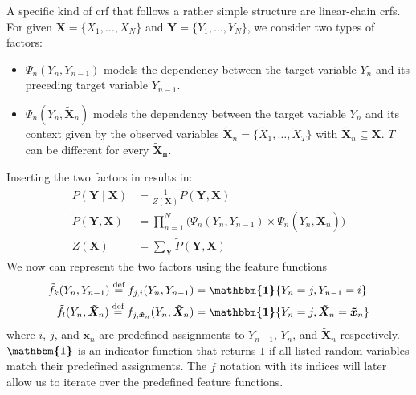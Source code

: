 \bigskip

A specific kind of \gls{crf} that follows a rather simple structure are \glspl{linear-chain crf}.
For given $\bm{X}=\{X_1,\dots,X_N\}$ and $\bm{Y}=\{Y_1,\dots,Y_N\}$, we consider two types of \glspl{factor}:
\begin{itemize}
  \item $\Psi_n(Y_n,Y_{n-1})$ models the dependency between the \gls{target variable} $Y_n$ and its preceding \gls{target variable} $Y_{n-1}$.
  \item $\Psi_n(Y_n,\bm{\tilde{X}}_n)$ models the dependency between the \gls{target variable} $Y_n$ and its context given by the \glspl{observed variable} $\bm{\tilde{X}}_n=\{\tilde{X}_1,\dots,\tilde{X}_T\}$ with $\bm{\tilde{X}}_n\subseteq\bm{X}$.
    $T$ can be different for every $\bm{\tilde{X}_n}$.
\end{itemize}
Inserting the two factors in  results in:
\begin{equation}
  \label{equ:linear-chain-crf-factor}
  \begin{split}
    P(\bm{Y}\mid\bm{X}) & = \frac{1}{Z(\bm{X})}\tilde{P}(\bm{Y},\bm{X}) \\
    \tilde{P}(\bm{Y},\bm{X}) &= \prod_{n=1}^{N}\Big(\Psi_n(Y_n,Y_{n-1})\times\Psi_n(Y_n,\bm{\tilde{X}}_n)\Big) \\
    Z(\bm{X}) & = \sum_{\bm{Y}}\tilde{P}(\bm{Y},\bm{X})
  \end{split}
\end{equation}
We now can represent the two \glspl{factor} using the \glspl{feature function}
\begin{equation}
  \label{equ:linear-chain-crf-feature-functions}
  \begin{split}
    \tilde{f}_k(Y_n,Y_{n-1})\equalsdef f_{j,i}(Y_n,Y_{n-1}) & = \bm{\mathbbm{1}}\{Y_n=j,Y_{n-1}=i\}\\
    \tilde{f}_l(Y_n,\bm{\tilde{X}}_n)\equalsdef f_{j,\bm{\tilde{x}}_n}( Y_n,\bm{\tilde{X}}_n) & = \bm{\mathbbm{1}}\{Y_n=j,\bm{\tilde{X}}_n=\bm{\tilde{x}}_n\}
  \end{split}
\end{equation}
where $i$, $j$, and $\bm{\tilde{x}}_n$ are predefined assignments to $Y_{n-1}$, $Y_n$, and $\bm{\tilde{X}}_n$ respectively. $\bm{\mathbbm{1}}$ is an indicator function that returns $1$ if all listed \glspl{random variable} match their predefined assignments.
The $\tilde{f}$ notation with its indices will later allow us to iterate over the predefined \glspl{feature function}.

